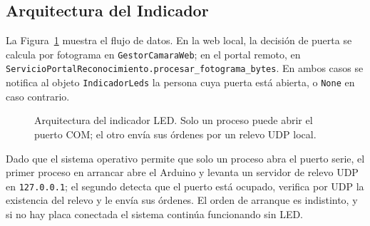 \documentclass{article}
\begin{document}
\subsection{Arquitectura del Indicador}
La Figura~\ref{fig:arquitectura-led} muestra el flujo de datos. En la web local, la decisión de puerta se calcula por fotograma en \texttt{GestorCamaraWeb}; en el portal remoto, en \texttt{ServicioPortalReconocimiento.procesar\_fotograma\_bytes}. En ambos casos se notifica al objeto \texttt{IndicadorLeds} la persona cuya puerta está abierta, o \texttt{None} en caso contrario.

\begin{figure}[H]
\centering
{}
\caption{Arquitectura del indicador LED. Solo un proceso puede abrir el puerto COM; el otro envía sus órdenes por un relevo UDP local.}
\label{fig:arquitectura-led}
\end{figure}

Dado que el sistema operativo permite que solo un proceso abra el puerto serie, el primer proceso en arrancar abre el Arduino y levanta un servidor de relevo UDP en \texttt{127.0.0.1}; el segundo detecta que el puerto está ocupado, verifica por UDP la existencia del relevo y le envía sus órdenes. El orden de arranque es indistinto, y si no hay placa conectada el sistema continúa funcionando sin LED.
\end{document}
